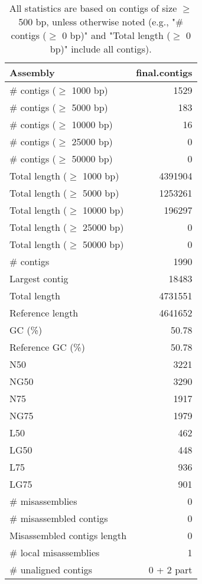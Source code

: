 \documentclass[12pt,a4paper]{article}
\begin{document}
\begin{table}[ht]
\begin{center}
\caption{All statistics are based on contigs of size $\geq$ 500 bp, unless otherwise noted (e.g., "\# contigs ($\geq$ 0 bp)" and "Total length ($\geq$ 0 bp)" include all contigs).}
\begin{tabular}{|l*{1}{|r}|}
\hline
Assembly & final.contigs \\ \hline
\# contigs ($\geq$ 1000 bp) & 1529 \\ \hline
\# contigs ($\geq$ 5000 bp) & 183 \\ \hline
\# contigs ($\geq$ 10000 bp) & 16 \\ \hline
\# contigs ($\geq$ 25000 bp) & 0 \\ \hline
\# contigs ($\geq$ 50000 bp) & 0 \\ \hline
Total length ($\geq$ 1000 bp) & 4391904 \\ \hline
Total length ($\geq$ 5000 bp) & 1253261 \\ \hline
Total length ($\geq$ 10000 bp) & 196297 \\ \hline
Total length ($\geq$ 25000 bp) & 0 \\ \hline
Total length ($\geq$ 50000 bp) & 0 \\ \hline
\# contigs & 1990 \\ \hline
Largest contig & 18483 \\ \hline
Total length & 4731551 \\ \hline
Reference length & 4641652 \\ \hline
GC (\%) & 50.78 \\ \hline
Reference GC (\%) & 50.78 \\ \hline
N50 & 3221 \\ \hline
NG50 & 3290 \\ \hline
N75 & 1917 \\ \hline
NG75 & 1979 \\ \hline
L50 & 462 \\ \hline
LG50 & 448 \\ \hline
L75 & 936 \\ \hline
LG75 & 901 \\ \hline
\# misassemblies & 0 \\ \hline
\# misassembled contigs & 0 \\ \hline
Misassembled contigs length & 0 \\ \hline
\# local misassemblies & 1 \\ \hline
\# unaligned contigs & 0 + 2 part \\ \hline

\end{tabular}
\end{center}
\end{table}
\end{document}
